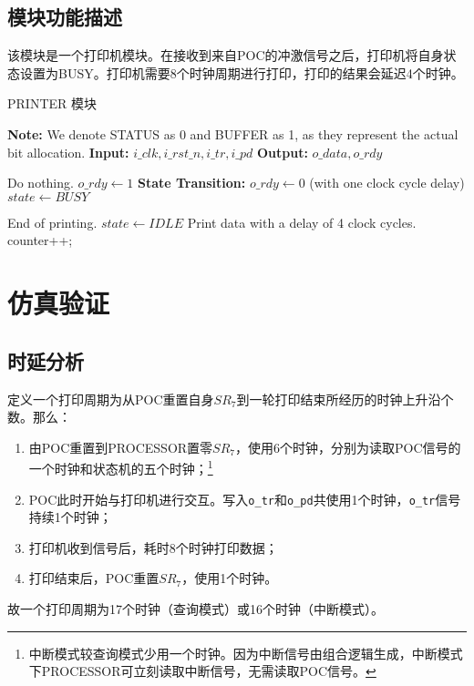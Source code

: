 \documentclass[lang=cn,a4paper,newtx]{elegantpaper}
\begin{document}
\subsection{模块功能描述}
该模块是一个打印机模块。在接收到来自POC的冲激信号之后，打印机将自身状态设置为BUSY。打印机需要8个时钟周期进行打印，打印的结果会延迟4个时钟。
\begin{algorithm}[H]
    \caption{PRINTER 模块}
    \label{alg:PRINTER}
    \begin{algorithmic}[1]
    \State \textbf{Note:} We denote STATUS as 0 and BUFFER as 1, as they represent the actual bit allocation.
    \State \textbf{Input:} $i\_clk, i\_rst\_n, i\_tr, i\_pd$
    \State \textbf{Output:} $o\_data, o\_rdy$
    

        \State Do nothing.
        \State $o\_rdy \gets 1$
        \State \textbf{State Transition: }
            \State $o\_rdy \gets 0$ (with one clock cycle delay)
            \State $ state \gets BUSY$
        \EndIf
    \EndProcedure
    
            \State End of printing.
            \State $ state \gets IDLE$
        \Else
            \State Print data with a delay of 4 clock cycles.
            \State counter++;
        \EndIf
    \EndProcedure
    \end{algorithmic}
\end{algorithm}

\section{仿真验证}
\subsection{时延分析}
定义一个打印周期为从POC重置自身$SR_7$到一轮打印结束所经历的时钟上升沿个数。那么：
\begin{enumerate}
    \item 由POC重置到PROCESSOR置零$SR_7$，使用6个时钟，分别为读取POC信号的一个时钟和状态机的五个时钟；\footnote{中断模式较查询模式少用一个时钟。因为中断信号由组合逻辑生成，中断模式下PROCESSOR可立刻读取中断信号，无需读取POC信号。}
    \item POC此时开始与打印机进行交互。写入\texttt{o\_tr}和\texttt{o\_pd}共使用1个时钟，\texttt{o\_tr}信号持续1个时钟；
    \item 打印机收到信号后，耗时8个时钟打印数据；
    \item 打印结束后，POC重置$SR_7$，使用1个时钟。
\end{enumerate}
故一个打印周期为17个时钟（查询模式）或16个时钟（中断模式）。
\end{document}
